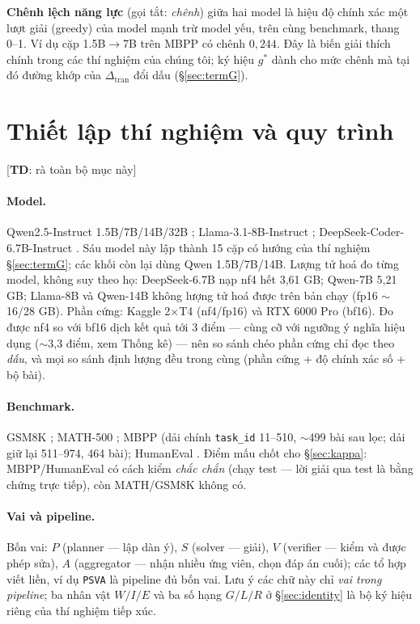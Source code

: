 \documentclass[11pt,a4paper]{article}
\newcommand{\todoTD}[1]{\textcolor{red!70!black}{[\textbf{TD}: #1]}}
\newcommand{\dceil}{\Delta_{\mathrm{tran}}}
\begin{document}
\textbf{Chênh lệch năng lực} (gọi tắt: \emph{chênh}) giữa hai model là hiệu độ chính xác một
lượt giải (greedy) của model mạnh trừ model yếu, trên cùng benchmark, thang 0--1. Ví dụ cặp
1.5B$\to$7B trên MBPP có chênh $0{,}244$. Đây là biến giải thích chính trong các thí nghiệm của
chúng tôi; ký hiệu $g^\ast$ dành cho mức chênh mà tại đó đường khớp của $\dceil$ đổi dấu
(\S\ref{sec:termG}).

\section{Thiết lập thí nghiệm và quy trình}\label{sec:setup}

\todoTD{rà toàn bộ mục này}

\paragraph{Model.} Qwen2.5-Instruct 1.5B/7B/14B/32B \cite{yang2024}; Llama-3.1-8B-Instruct
\cite{grattafiori2024}; DeepSeek-Coder-6.7B-Instruct \cite{guo2024}. Sáu model này lập thành 15
cặp có hướng của thí nghiệm \S\ref{sec:termG}; các khối còn lại dùng Qwen 1.5B/7B/14B. Lượng tử
hoá đo từng model, không suy theo họ: DeepSeek-6.7B nạp nf4 hết 3,61 GB; Qwen-7B 5,21 GB;
Llama-8B và Qwen-14B không lượng tử hoá được trên bản chạy (fp16 $\sim$16/28 GB). Phần cứng:
Kaggle 2$\times$T4 (nf4/fp16) và RTX 6000 Pro (bf16). Đo được nf4 so với bf16 dịch kết quả tới
3 điểm --- cùng cỡ với ngưỡng ý nghĩa hiệu dụng ($\sim$3,3 điểm, xem Thống kê) --- nên so sánh
chéo phần cứng chỉ đọc theo \emph{dấu}, và mọi so sánh định lượng đều trong cùng (phần cứng +
độ chính xác số + bộ bài).

\paragraph{Benchmark.} GSM8K \cite{cobbe2021}; MATH-500 \cite{hendrycks2021}; MBPP
\cite{austin2021} (dải chính \texttt{task\_id} 11--510, $\sim$499 bài sau lọc; dải giữ lại
511--974, 464 bài); HumanEval \cite{chen2021}. Điểm mấu chốt cho \S\ref{sec:kappa}:
MBPP/HumanEval có cách kiểm \emph{chắc chắn} (chạy test --- lời giải qua test là bằng chứng
trực tiếp), còn MATH/GSM8K không có.

\paragraph{Vai và pipeline.} Bốn vai: $P$ (planner --- lập dàn ý), $S$ (solver --- giải), $V$
(verifier --- kiểm và được phép sửa), $A$ (aggregator --- nhận nhiều ứng viên, chọn đáp án
cuối); các tổ hợp viết liền, ví dụ \texttt{PSVA} là pipeline đủ bốn vai. Lưu ý các chữ này chỉ
\emph{vai trong pipeline}; ba nhân vật $W/I/E$ và ba số hạng $G/L/R$ ở \S\ref{sec:identity} là
bộ ký hiệu riêng của thí nghiệm tiếp xúc.
\end{document}
